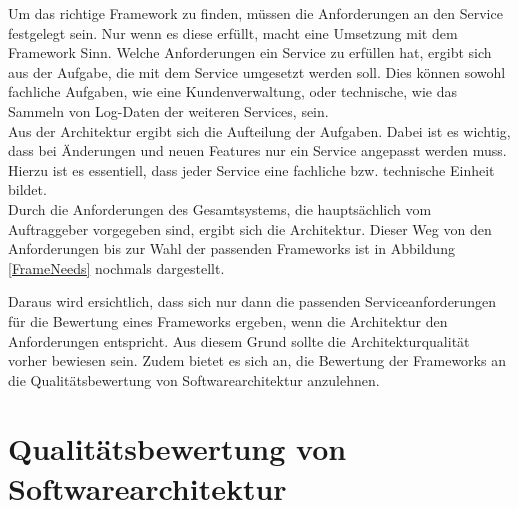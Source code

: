 Um das richtige Framework zu finden, müssen die Anforderungen an den Service festgelegt sein. Nur wenn es diese erfüllt, macht eine Umsetzung mit dem Framework Sinn. Welche Anforderungen ein Service zu erfüllen hat, ergibt sich aus der Aufgabe, die mit dem Service umgesetzt werden soll. Dies können sowohl fachliche Aufgaben, wie eine Kundenverwaltung, oder technische, wie das Sammeln von Log-Daten der weiteren Services, sein.\\
Aus der Architektur ergibt sich die Aufteilung der Aufgaben. Dabei ist es wichtig, dass bei Änderungen und neuen Features nur ein Service angepasst werden muss. Hierzu ist es essentiell, dass jeder Service eine fachliche bzw. technische Einheit bildet.\\
Durch die Anforderungen des Gesamtsystems, die hauptsächlich vom Auftraggeber vorgegeben sind, ergibt sich die Architektur. Dieser Weg von den Anforderungen bis zur Wahl der passenden Frameworks ist in Abbildung \ref{FrameNeeds} nochmals dargestellt.
    
 
Daraus wird ersichtlich, dass sich nur dann die passenden Serviceanforderungen für die Bewertung eines Frameworks ergeben, wenn die Architektur den Anforderungen entspricht. Aus diesem Grund sollte die Architekturqualität vorher bewiesen sein. Zudem bietet es sich an, die Bewertung der Frameworks an die Qualitätsbewertung von Softwarearchitektur anzulehnen.
 
\pagebreak
\section{Qualitätsbewertung von Softwarearchitektur}


